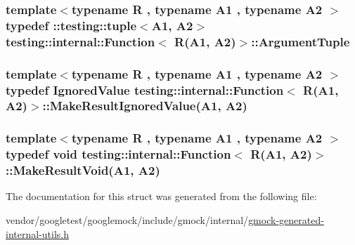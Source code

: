 \subsubsection[{\texorpdfstring{Argument\+Tuple}{ArgumentTuple}}]{\setlength{\rightskip}{0pt plus 5cm}template$<$typename R , typename A1 , typename A2 $>$ typedef \+::testing\+::tuple$<$A1, A2$>$ {\bf testing\+::internal\+::\+Function}$<$ R(A1, A2)$>$\+::{\bf Argument\+Tuple}}\hypertarget{structtesting_1_1internal_1_1Function_3_01R_07A1_00_01A2_08_4_a2de00437877c29ec6cb78396928b8e3e}{}\label{structtesting_1_1internal_1_1Function_3_01R_07A1_00_01A2_08_4_a2de00437877c29ec6cb78396928b8e3e}
\subsubsection[{\texorpdfstring{Make\+Result\+Ignored\+Value}{MakeResultIgnoredValue}}]{\setlength{\rightskip}{0pt plus 5cm}template$<$typename R , typename A1 , typename A2 $>$ typedef {\bf Ignored\+Value} {\bf testing\+::internal\+::\+Function}$<$ R(A1, A2)$>$\+::Make\+Result\+Ignored\+Value(A1, A2)}\hypertarget{structtesting_1_1internal_1_1Function_3_01R_07A1_00_01A2_08_4_a89033ea870fe831b13899ce36666e102}{}\label{structtesting_1_1internal_1_1Function_3_01R_07A1_00_01A2_08_4_a89033ea870fe831b13899ce36666e102}
\subsubsection[{\texorpdfstring{Make\+Result\+Void}{MakeResultVoid}}]{\setlength{\rightskip}{0pt plus 5cm}template$<$typename R , typename A1 , typename A2 $>$ typedef void {\bf testing\+::internal\+::\+Function}$<$ R(A1, A2)$>$\+::Make\+Result\+Void(A1, A2)}\hypertarget{structtesting_1_1internal_1_1Function_3_01R_07A1_00_01A2_08_4_ada1ad22fa21c84ec3faea47ed20c1b46}{}\label{structtesting_1_1internal_1_1Function_3_01R_07A1_00_01A2_08_4_ada1ad22fa21c84ec3faea47ed20c1b46}


The documentation for this struct was generated from the following file\+:\begin{DoxyCompactItemize}
\item 
vendor/googletest/googlemock/include/gmock/internal/\hyperlink{gmock-generated-internal-utils_8h}{gmock-\/generated-\/internal-\/utils.\+h}\end{DoxyCompactItemize}
